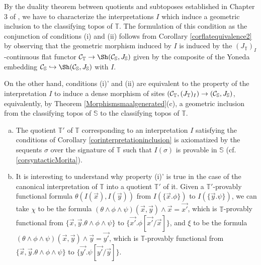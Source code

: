 \documentclass[a4paper,12pt]{article}
\begin{document}
\begin{proofs}
	By the duality theorem between quotients and subtoposes established in Chapter 3 of \cite{OCBook}, we have to characterize the interpretations $I$ which induce a geometric inclusion to the classifying topos of $\mathbb T$. The formulation of this condition as the conjunction of conditions (i) and (ii) follows from Corollary \ref{corflatequivalence2} by observing that the geometric morphism induced by $I$ is induced by the $(J_{\mathbb T})_{I}$-continuous flat functor ${\cal C}_{\mathbb T}\to \Sh({\cal C}_{\mathbb S}, J_{\mathbb S})$ given by the composite of the Yoneda embedding ${\cal C}_{\mathbb S}\hookrightarrow \Sh({\cal C}_{\mathbb S}, J_{\mathbb S})$ with $I$.
	
	On the other hand, conditions (i)' and (ii) are equivalent to the property of the interpretation $I$ to induce a dense morphism of sites $({\cal C}_{\mathbb T}, (J_{\mathbb T})_{I})\to ({\cal C}_{\mathbb S}, J_{\mathbb S})$, equivalently, by Theorem \ref{Morphismsmaalgenerated}(c), a geometric inclusion from the classifying topos of ${\mathbb S}$ to the classifying topos of $\mathbb T$. 	
\end{proofs}

\begin{remarks}
	\begin{enumerate}[(a)]
		\item The quotient ${\mathbb T}'$ of ${\mathbb T}$ corresponding to an interpretation $I$ satisfying the conditions of Corollary \ref{corinterpretationinclusion} is axiomatized by the sequents $\sigma$ over the signature of $\mathbb T$ such that $I(\sigma)$ is provable in $\mathbb S$ (cf. \ref{corsyntacticMorita}). 
		
		\item It is interesting to understand why property (i)' is true in the case of the canonical interpretation of $\mathbb T$ into a quotient ${\mathbb T}'$ of it.
		Given a ${\mathbb T}'$-provably functional formula $\theta(I(\vec{x}), I(\vec{y}))$ from $I(\{\vec{x}. \phi\})$ to $I(\{\vec{y}. \psi\})$, we can take $\chi$ to be the formula $(\theta \wedge \phi \wedge \psi)(\vec{x}, \vec{y}) \wedge \vec{x}=\vec{x'}$, which is ${\mathbb T}$-provably functional from $\{\vec{x}, \vec{y}. \theta \wedge \phi \wedge \psi\}$ to $\{\vec{x'}. \phi[\vec{x'}\slash \vec{x}]\}$, and $\xi$ to be the formula $(\theta \wedge \phi \wedge \psi)(\vec{x}, \vec{y}) \wedge \vec{y}=\vec{y'}$, which is $\mathbb T$-provably functional from $\{\vec{x}, \vec{y}. \theta \wedge \phi \wedge \psi\}$ to $\{\vec{y'}. \psi[\vec{y'}\slash \vec{y}]\}$.  		 
	\end{enumerate}
	\end{remarks}
\end{document}
